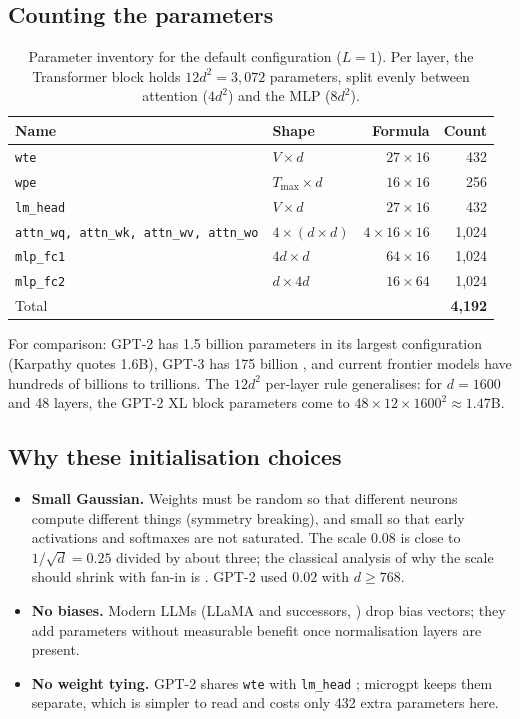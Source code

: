 \documentclass[11pt,letterpaper]{article}
\theoremstyle{remark}
\newcommand{\code}[1]{\lstinline[basicstyle=\ttfamily\small]|#1|}
\begin{document}
\subsection{Counting the parameters}

\begin{table}[h]
\centering\small
\begin{tabular}{@{}llrr@{}}
\toprule
Name & Shape & Formula & Count \\
\midrule
\code{wte} & $V\times d$ & $27\times 16$ & 432 \\
\code{wpe} & $T_{\max}\times d$ & $16\times 16$ & 256 \\
\code{lm_head} & $V\times d$ & $27\times 16$ & 432 \\
\code{attn_wq, attn_wk, attn_wv, attn_wo} & $4\times(d\times d)$ & $4\times 16\times 16$ & 1{,}024 \\
\code{mlp_fc1} & $4d\times d$ & $64\times 16$ & 1{,}024 \\
\code{mlp_fc2} & $d\times 4d$ & $16\times 64$ & 1{,}024 \\
\midrule
Total & & & \textbf{4{,}192} \\
\bottomrule
\end{tabular}
\caption{Parameter inventory for the default configuration ($L=1$). Per layer, the Transformer block holds $12d^2 = 3{,}072$ parameters, split evenly between attention ($4d^2$) and the MLP ($8d^2$).}
\label{tab:params}
\end{table}

For comparison: GPT-2 \parencite{radford2019gpt2} has 1.5 billion parameters in its largest configuration (Karpathy quotes 1.6B), GPT-3 has 175 billion \parencite{brown2020gpt3}, and current frontier models have hundreds of billions to trillions. The $12 d^2$ per-layer rule generalises: for $d = 1600$ and 48 layers, the GPT-2 XL block parameters come to $48\times 12\times 1600^2 \approx 1.47$B.

\subsection{Why these initialisation choices}

\begin{itemize}[leftmargin=2em]
  \item \textbf{Small Gaussian.} Weights must be random so that different neurons compute different things (symmetry breaking), and small so that early activations and softmaxes are not saturated. The scale $0.08$ is close to $1/\sqrt{d}=0.25$ divided by about three; the classical analysis of why the scale should shrink with fan-in is \textcite{glorot2010init}. GPT-2 used $0.02$ with $d\ge 768$.
  \item \textbf{No biases.} Modern LLMs (LLaMA and successors, \citeauthor{touvron2023llama} \citeyear{touvron2023llama}) drop bias vectors; they add parameters without measurable benefit once normalisation layers are present.
  \item \textbf{No weight tying.} GPT-2 shares \code{wte} with \code{lm_head} \parencite{press2017weighttying}; microgpt keeps them separate, which is simpler to read and costs only 432 extra parameters here.
\end{itemize}
\end{document}
